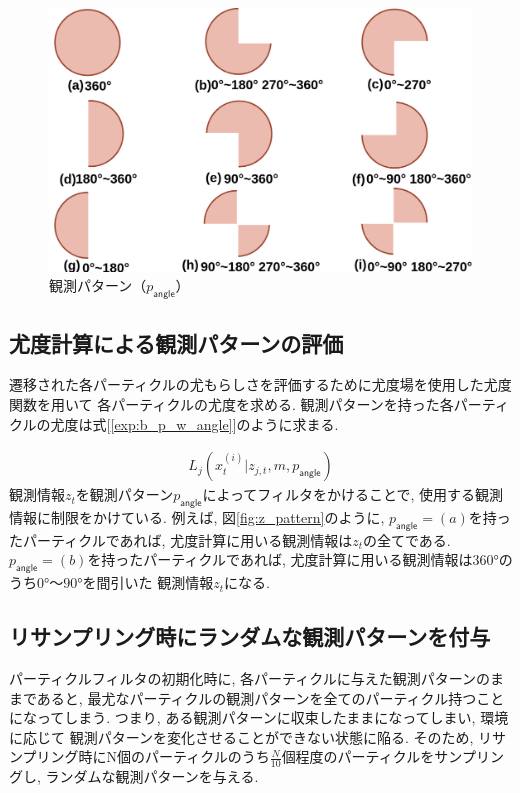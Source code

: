 \newpage

\begin{figure}[H]
  \begin{center}
    \includegraphics[width=0.8\linewidth]{figs/obs_pangle.png}
    \caption{観測パターン（$p_\mathsf{angle}$）}
    \label{fig:1}
  \end{center}
\end{figure}

\subsection{尤度計算による観測パターンの評価}

遷移された各パーティクルの尤もらしさを評価するために尤度場を使用した尤度関数を用いて
各パーティクルの尤度を求める. 
観測パターンを持った各パーティクルの尤度は式[\ref{exp:b_p_w_angle}]のように求まる. 

\begin{eqnarray}
  \label{exp:b_p_w_angle}
  L_j(x_{t}^{(i)} | z_{j, t}, m, p_\mathsf{angle})
\end{eqnarray}
観測情報$z_t$を観測パターン$p_\mathsf{angle}$によってフィルタをかけることで, 使用する観測情報に制限をかけている. 
例えば, 図\ref{fig:z_pattern}のように, $p_\mathsf{angle} = (a)$を持ったパーティクルであれば, 
尤度計算に用いる観測情報は$z_t$の全てである. 
$p_\mathsf{angle} = (b)$を持ったパーティクルであれば, 尤度計算に用いる観測情報は$360°$のうち$0°〜90°$を間引いた
観測情報$z_t$になる. 


\subsection{リサンプリング時にランダムな観測パターンを付与}

パーティクルフィルタの初期化時に, 各パーティクルに与えた観測パターンのままであると, 
最尤なパーティクルの観測パターンを全てのパーティクル持つことになってしまう. 
つまり, ある観測パターンに収束したままになってしまい, 環境に応じて
観測パターンを変化させることができない状態に陥る. 
そのため, リサンプリング時にN個のパーティクルのうち$\frac{N}{10}$個程度のパーティクルをサンプリングし, 
ランダムな観測パターンを与える. 

